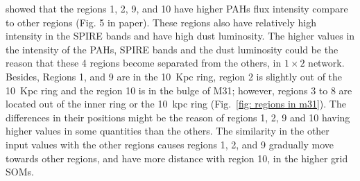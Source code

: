         \cite{Dim15} showed that the regions 1, 2, 9, and 10 have higher PAHs flux intensity compare to other regions (Fig. 5 in \cite{Dim15} paper). 
        These regions also have relatively high intensity in the SPIRE bands and have high dust luminosity.
        The higher values in the intensity of the PAHs, SPIRE bands and the dust luminosity could be the reason that these 4 regions become separated from the others, in $1\times2$ network.
        Besides, Regions 1, and 9 are in the 10~Kpc ring, region 2 is slightly out of the 10~Kpc ring and the region 10 is in the bulge of M31; however, regions 3 to 8 are located out of the inner ring or the 10~kpc ring (Fig.~\ref{fig: regions in m31}).   
        The differences in their positions might be the reason of regions 1, 2, 9 and 10 having higher values in some quantities than the others. 
        The similarity in the other input values with the other regions causes regions 1, 2, and 9 gradually move towards other regions, and have more distance with region 10, in the higher grid SOMs.
        
        
